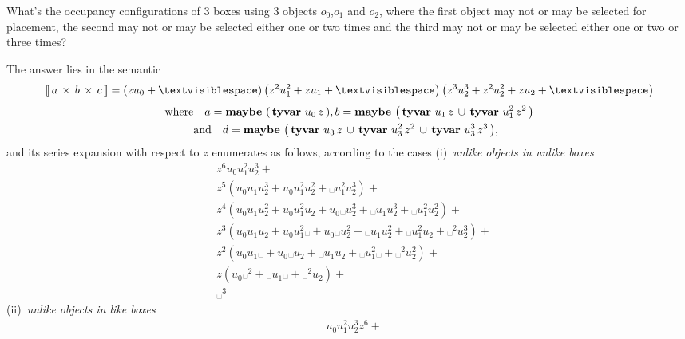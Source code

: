 \begin{example}
What's the occupancy configurations of $3$ boxes using $3$ objects
$o_{0}$,$o_{1}$ and $o_{2}$, where the first object may not or may be selected
for placement, the second may not or may be selected either one or two times
    and the third may not or may be selected either one or two or three times?

The answer lies in the semantic
\begin{displaymath}
    \semantic{\tycp{a}{\tycp{b}{c}}} = \left(z u_{0} + ␣\right) \left(z^{2} u_{1}^{2} + z u_{1} + ␣\right) \left(z^{3} u_{2}^{3} + z^{2} u_{2}^{2} + z u_{2} + ␣\right)
\end{displaymath}
\begin{displaymath}
\begin{split}
\text{where}&\quad
a={\textbf{maybe}\,\left(\,\textbf{tyvar}\,\,u_{0}\,z\,\right)}, b={\textbf{maybe}\,\left(\,\textbf{tyvar}\,\,u_{1}\,z\,\cup\,\textbf{tyvar}\,\,u_{1}^{2}\,z^{2}\,\right)}\\
\quad&\text{and}\quad d={\textbf{maybe}\,\left(\,\textbf{tyvar}\,\,u_{3}\,z\,\cup\,\textbf{tyvar}\,\,u_{3}^{2}\,z^{2}\,\cup\,\textbf{tyvar}\,\,u_{3}^{3}\,z^{3}\,\right)},
\end{split}
\end{displaymath}
and its series expansion with respect to $z$ enumerates as follows,
according to the cases (i)~\textit{unlike objects in unlike boxes}
\begin{displaymath}
\begin{split}
&z^{6} u_{0} u_{1}^{2} u_{2}^{3} + \\
&z^{5} \left(u_{0} u_{1} u_{2}^{3} + u_{0} u_{1}^{2} u_{2}^{2} + ␣ u_{1}^{2} u_{2}^{3}\right) + \\
&z^{4} \left(u_{0} u_{1} u_{2}^{2} + u_{0} u_{1}^{2} u_{2} + u_{0} ␣ u_{2}^{3} + ␣ u_{1} u_{2}^{3} + ␣ u_{1}^{2} u_{2}^{2}\right) + \\
&z^{3} \left(u_{0} u_{1} u_{2} + u_{0} u_{1}^{2} ␣ + u_{0} ␣ u_{2}^{2} + ␣ u_{1} u_{2}^{2} + ␣ u_{1}^{2} u_{2} + ␣^{2} u_{2}^{3}\right) + \\
&z^{2} \left(u_{0} u_{1} ␣ + u_{0} ␣ u_{2} + ␣ u_{1} u_{2} + ␣ u_{1}^{2} ␣ + ␣^{2} u_{2}^{2}\right) + \\
&z \left(u_{0} ␣^{2} + ␣ u_{1} ␣ + ␣^{2} u_{2}\right) + \\
&␣^{3}
\end{split}
\end{displaymath}
(ii)~\textit{unlike objects in like boxes}
\begin{displaymath}
\begin{split}
&u_{0} u_{1}^{2} u_{2}^{3} z^{6} + \\

\end{split}
\end{displaymath}
\end{example}
